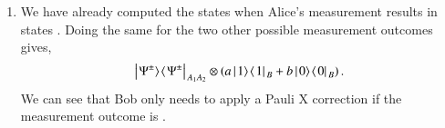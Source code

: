 \begin{solution}
\begin{enumerate}[label=(\alph*)]
\begin{align*}
        & = a \ket{\Phi^-}\bra{\Phi^-}_{A_1A_2} \outp{0}{0}_B + b \outp{\Phi^-}{\Phi^-}_{A_1A_2} \outp{1}{1}_B \\
        & = \outp{\Phi^-}{\Phi^-}_{A_1A_2}\rho_B.
    \end{align*}
    \item We have already computed the states when Alice's measurement results in states \ket{\Phi^{\pm}}. Doing the same for the two other possible measurement outcomes gives,
    \begin{equation*}
        \left|\left. \Psi^{\pm} \rangle\right.\!\langle\left. \Psi^{\pm} \right|\right. _{A_1A_2} \otimes \left( a\left|\left. 1 \rangle\right.\!\langle\left. 1 \right|\right. _B + b \left|\left. 0 \rangle\right.\!\langle\left. 0 \right|\right. _B \right).
    \end{equation*}
    We can see that Bob only needs to apply a Pauli X correction if the measurement outcome is \ket{\Psi^{\pm}}.
\end{enumerate}
\end{solution}

